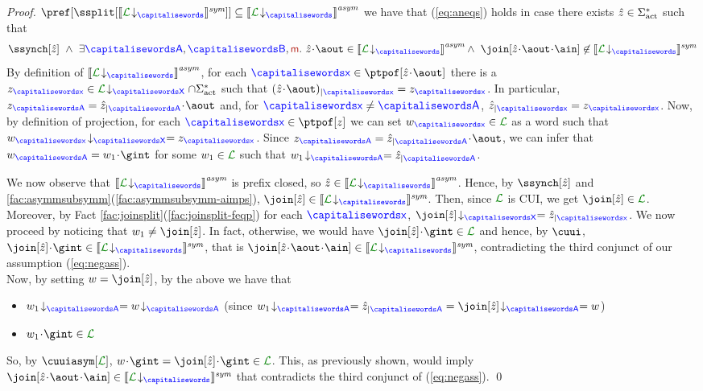 \begin{proof}
 $\pref[{\ssplit[{\ssem{\proj{\clang}{}}}]}] \subseteq \asem{\proj{\clang}{}}$
 we have that  (\ref{eq:aneqs}) holds in case there exists $\hat z \in\Sigma_{\text{act}}^*$ such that
 \begin{equation}
 \label{eq:negass}
 \ssynch[\hat z]\ \land\ \exists \p,\q,\msg[m].\  \hat z\cat\aout \in \asem{\proj{\clang}{}} \land\  \join[{\hat z\cat\aout\cat\ain}]\not\in\ssem{\proj{\clang}{}}
 \end{equation}
 By definition of $\asem{\proj{\clang}{}}$, 
for each $\px\in\ptpof[\hat z\cat\aout]$  there is a $z_{\px}\in\proj{\clang}{X}\cap\alfact^*$ such that
$\filter{(\hat z\cat\aout)}{\px}=z_{\px}$. In particular, $z_{\p}= \filter{\hat z}{\p}\cat\aout$ and,
for  $\px\neq\p$, $\filter{\hat z}{\px}=z_{\px}$.
Now, by definition of projection,  for each $\px\in\ptpof[z]$ we can set $\acword_{\px}\in\clang$
as a word such that  $\proj{\acword_{\px}}{X}= z_{\px}$. 
Since $z_{\p}= \filter{\hat z}{\p}\cat\aout$, we can infer that  
$\acword_{\p}= \acword_1\cat\gint$ for some $\acword_1\in\clang$ such that
$\proj{\acword_1}{A}= \filter{\hat z}{\p}$. 
 
 We now observe that  $\asem{\proj{\clang}{}}$ is prefix closed, 
so $\hat z\in \asem{\proj{\clang}{}}$. 
Hence, by $ \ssynch[\hat z]$ and  
\cref{fac:asymmsubsymm}(\ref{fac:asymmsubsymm-aimps}), 
$\join[\hat z]\in\ssem{\proj{\clang}{}}$. Then,
since $\clang$ is CUI, we get $\join[\hat z]\in\clang$. 
Moreover, by Fact \ref{fac:joinsplit}(\ref{fac:joinsplit-feqp}) for each $\px$,
$\proj{\join[\hat z]}{X}=\filter{\hat z}{\px}$. 
We now proceed by noticing that $\acword_1\neq\join[\hat z]$. In fact, otherwise, we would have $\join[\hat z]\cat\gint\in\clang$
and hence, by $\cuui$, 
${\join[\hat z]}\cat\gint\in\ssem{\proj{\clang}{}}$, 
that is $\join[{\hat z\cat\aout\cat\ain}]\in\ssem{\proj{\clang}{}}$,
contradicting the third conjunct of our assumption (\ref{eq:negass}).\\
 Now, by setting $\acword=\join[\hat z]$, by the above
we have that
\begin{itemize}
\item
$\proj{\acword_1}{A} = \proj{\acword}{A}$\qquad 
(since $\proj{\acword_1}{A}=\filter{\hat z}{\p}=\proj{\join[\hat z]}{A}=\acword$)
\item
$\acword_1\cat\gint\in\clang$
\end{itemize} 
So, by $\cuuiasym[\clang]$, $\acword\cat\gint=\join[\hat z]\cat\gint\in\clang$. 
This, as previously shown, would imply  $\join[{\hat z\cat\aout\cat\ain}]\in\ssem{\proj{\clang}{}}$ that contradicts the third conjunct of (\ref{eq:negass}).
\qed
 \end{proof}
 
